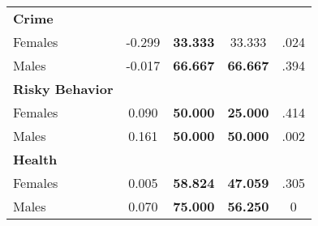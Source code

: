 \begin{tabular}{l c c c c}
\midrule
\textbf{Crime} & & & & \\
\quad Females &     -0.299 & \textbf{   33.333} &    33.333 & .024 \\
\quad Males &     -0.017 & \textbf{   66.667} & \textbf{   66.667} & .394 \\
\midrule
\textbf{Risky Behavior} & & & & \\
\quad Females &      0.090 & \textbf{   50.000} & \textbf{   25.000} & .414 \\
\quad Males &      0.161 & \textbf{   50.000} & \textbf{   50.000} & .002 \\
\midrule
\textbf{Health} & & & & \\
\quad Females &      0.005 & \textbf{   58.824} & \textbf{   47.059} & .305 \\
\quad Males &      0.070 & \textbf{   75.000} & \textbf{   56.250} & 0 \\
\bottomrule
\end{tabular}
